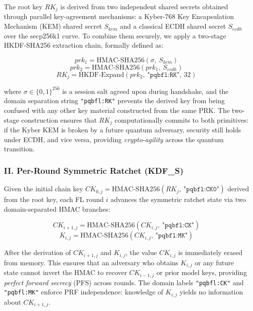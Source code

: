 \documentclass[journal, 10pt, twocolumn]{IEEEtran}
\begin{document}
The root key $RK_j$ is derived from two independent shared secrets obtained through parallel key-agreement mechanisms: a Kyber-768 Key Encapsulation Mechanism (KEM) shared secret $S_{kem}$ and a classical ECDH shared secret $S_{ecdh}$ over the secp256k1 curve. To combine them securely, we apply a two-stage HKDF-SHA256 extraction chain, formally defined as:

\begin{equation}
prk_1 = \text{HMAC-SHA256}(\sigma,\ S_{kem})
\label{eq:prk1}
\end{equation}
\begin{equation}
prk_2 = \text{HMAC-SHA256}(prk_1,\ S_{ecdh})
\label{eq:prk2}
\end{equation}
\begin{equation}
RK_j = \text{HKDF-Expand}(prk_2,\ \texttt{"pqbfl:RK"},\ 32)
\label{eq:rk}
\end{equation}

where $\sigma \in \{0,1\}^{256}$ is a session salt agreed upon during handshake, and the domain separation string \texttt{"pqbfl:RK"} prevents the derived key from being confused with any other key material constructed from the same PRK. The two-stage construction ensures that $RK_j$ computationally commits to both primitives: if the Kyber KEM is broken by a future quantum adversary, security still holds under ECDH, and vice versa, providing \textit{crypto-agility} across the quantum transition.

\subsubsection{II. Per-Round Symmetric Ratchet (KDF\_S)}

Given the initial chain key $CK_{0,j} = \text{HMAC-SHA256}(RK_j,\ \texttt{"pqbfl:CK0"})$ derived from the root key, each FL round $i$ advances the symmetric ratchet state via two domain-separated HMAC branches:

\begin{equation}
CK_{i+1,j} = \text{HMAC-SHA256}(CK_{i,j},\ \texttt{"pqbfl:CK"})
\label{eq:ck_next}
\end{equation}
\begin{equation}
K_{i,j} = \text{HMAC-SHA256}(CK_{i,j},\ \texttt{"pqbfl:MK"})
\label{eq:mk}
\end{equation}

After the derivation of $CK_{i+1,j}$ and $K_{i,j}$, the value $CK_{i,j}$ is immediately erased from memory. This ensures that an adversary who obtains $K_{i,j}$ or any future state cannot invert the HMAC to recover $CK_{i-1,j}$ or prior model keys, providing \textit{perfect forward secrecy} (PFS) across rounds. The domain labels \texttt{"pqbfl:CK"} and \texttt{"pqbfl:MK"} enforce PRF independence: knowledge of $K_{i,j}$ yields no information about $CK_{i+1,j}$.
\end{document}
